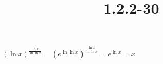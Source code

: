 \documentclass{article}
\title{1.2.2-30}
\begin{document}
\maketitle

\( (\ln x)^{\frac{\ln x}{\ln{\ln{x}}}} = (e^{\ln\ln{x}})^{\frac{\ln x}{\ln{\ln{x}}}} = e^{\ln{x}} = x \)
\end{document}

